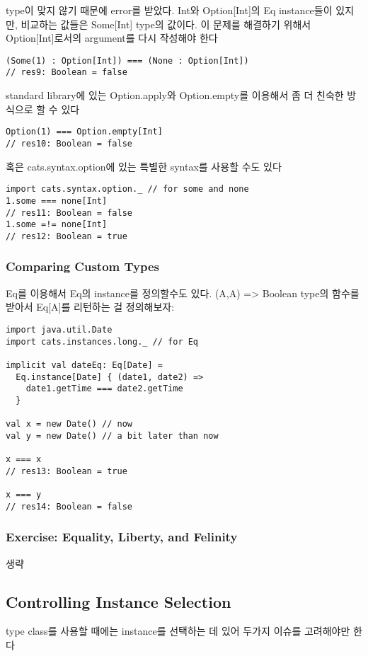 \documentclass[a4paper]{article}
\begin{document}
type이 맞지 않기 때문에 error를 받았다. Int와 Option[Int]의 Eq instance들이 있지만, 비교하는 값들은 Some[Int] type의 값이다. 이 문제를 해결하기 위해서 Option[Int]로서의 argument를 다시 작성해야 한다

\begin{verbatim}
(Some(1) : Option[Int]) === (None : Option[Int])
// res9: Boolean = false
\end{verbatim}

standard library에 있는 Option.apply와 Option.empty를 이용해서 좀 더 친숙한 방식으로 할 수 있다

\begin{verbatim}
Option(1) === Option.empty[Int]
// res10: Boolean = false
\end{verbatim}

혹은 cats.syntax.option에 있는 특별한 syntax를 사용할 수도 있다

\begin{verbatim}
import cats.syntax.option._ // for some and none
1.some === none[Int]
// res11: Boolean = false
1.some =!= none[Int]
// res12: Boolean = true
\end{verbatim}

\subsubsection{Comparing Custom Types}
\label{sec:orgf79e59d}
Eq를 이용해서 Eq의 instance를 정의할수도 있다. (A,A) => Boolean type의 함수를 받아서 Eq[A]를 리턴하는 걸 정의해보자:

\begin{verbatim}
import java.util.Date
import cats.instances.long._ // for Eq

implicit val dateEq: Eq[Date] =
  Eq.instance[Date] { (date1, date2) =>
    date1.getTime === date2.getTime
  }

val x = new Date() // now
val y = new Date() // a bit later than now

x === x
// res13: Boolean = true

x === y
// res14: Boolean = false
\end{verbatim}

\subsubsection{Exercise: Equality, Liberty, and Felinity}
\label{sec:orgd20fba4}
생략

\subsection{Controlling Instance Selection}
\label{sec:org14bf1a4}
type class를 사용할 때에는 instance를 선택하는 데 있어 두가지 이슈를 고려해야만 한다
\end{document}
